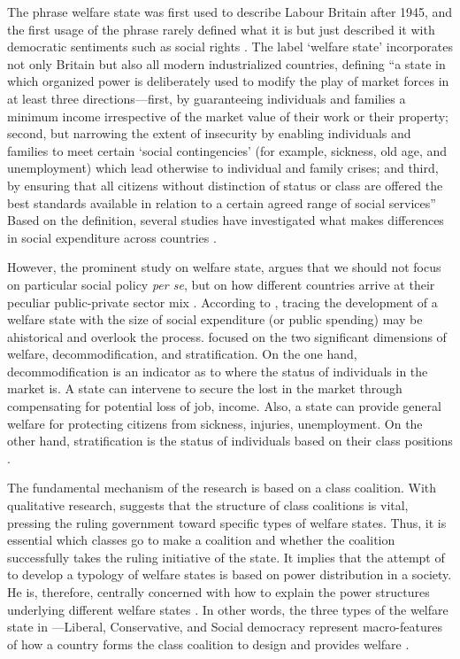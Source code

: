 \documentclass[11pt, notitlepage]{article}
\begin{document}
The phrase welfare state was first used to describe Labour Britain after 1945, and the first usage of the phrase rarely defined what it is but just described it with democratic sentiments such as social rights \citep[9-10]{Briggs1961}. The label ‘welfare state’ incorporates not only Britain but also all modern industrialized countries, defining “a state in which organized power is deliberately used to modify the play of market forces in at least three directions---first, by guaranteeing individuals and families a minimum income irrespective of the market value of their work or their property; second, but narrowing the extent of insecurity by enabling individuals and families to meet certain ‘social contingencies’ (for example, sickness, old age, and unemployment) which lead otherwise to individual and family crises; and third, by ensuring that all citizens without distinction of status or class are offered the best standards available in relation to a certain agreed range of social services” \citep[14]{Briggs1961} Based on the definition, several studies have investigated what makes differences in social expenditure across countries \citep{Cameron1978, Rodrik1998, Adsera2002}.\par

However, the prominent study on welfare state, \citet{Gosta1990} argues that we should not focus on particular social policy \textit{per se}, but on how different countries arrive at their peculiar public-private sector mix \citep[2]{Gosta1990}. According to \citet{Gosta1990}, tracing the development of a welfare state with the size of social expenditure (or public spending) may be ahistorical and overlook the process. \citet{Gosta1990} focused on the two significant dimensions of welfare, decommodification, and stratification. On the one hand, decommodification is an indicator as to where the status of individuals in the market is. A state can intervene to secure the lost in the market through compensating for potential loss of job, income. Also, a state can provide general welfare for protecting citizens from sickness, injuries, unemployment. On the other hand, stratification is the status of individuals based on their class positions \citep{Gosta1990}.\par

The fundamental mechanism of the research is based on a class coalition. With qualitative research, \citet{Gosta1990} suggests that the structure of class coalitions is vital, pressing the ruling government toward specific types of welfare states. Thus, it is essential which classes go to make a coalition and whether the coalition successfully takes the ruling initiative of the state. It implies that the attempt of \citet{Gosta1990} to develop a typology of welfare states is based on power distribution in a society. He is, therefore, centrally concerned with how to explain the power structures underlying different welfare states \citep[88]{Kemeny1995}. In other words, the three types of the welfare state in \citet{Gosta1990}---Liberal, Conservative, and Social democracy represent macro-features of how a country forms the class coalition to design and provides welfare \citep[646]{Scruggs2008}.
\end{document}
